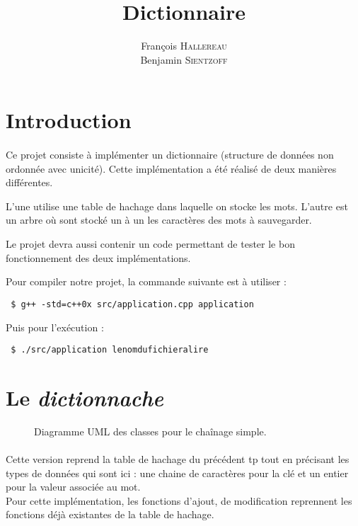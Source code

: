 \documentclass[12pt,a4paper,final]{article}
\author{François \textsc{Hallereau} \\ Benjamin \textsc{Sientzoff}}
\title{Dictionnaire}
\begin{document}
\maketitle

\vspace{5cm}

\tableofcontents

\newpage

\section*{Introduction}
\paragraph{}{
Ce projet consiste à implémenter un dictionnaire (structure de données non ordonnée avec unicité). Cette implémentation a été réalisé de deux manières différentes. 

L'une utilise une table de hachage dans laquelle on stocke les mots. L'autre est un arbre où sont stocké un à un les caractères des mots à sauvegarder.

Le projet devra aussi contenir un code permettant de tester le bon fonctionnement des deux implémentations.

Pour compiler notre projet, la commande suivante est à utiliser :
\begin{verbatim}
 $ g++ -std=c++0x src/application.cpp application
\end{verbatim}

Puis pour l'exécution :
\begin{verbatim}
 $ ./src/application lenomdufichieralire
\end{verbatim}
}


\newpage

\section{Le \emph{dictionnache}}

		\begin{figure}[!h]
			\hspace{-2cm}
			
			\caption{Diagramme UML des classes pour le chaînage simple.}
			\label{chaine_1_uml}
		\end{figure}
		
	\paragraph{}{Cette version reprend la table de hachage du précédent tp tout en précisant les types de données qui sont ici : une chaine de caractères pour la clé et un entier pour la valeur associée au mot. \\
Pour cette implémentation, les fonctions d'ajout, de modification reprennent les fonctions déjà existantes de la table de hachage.}
\end{document}
